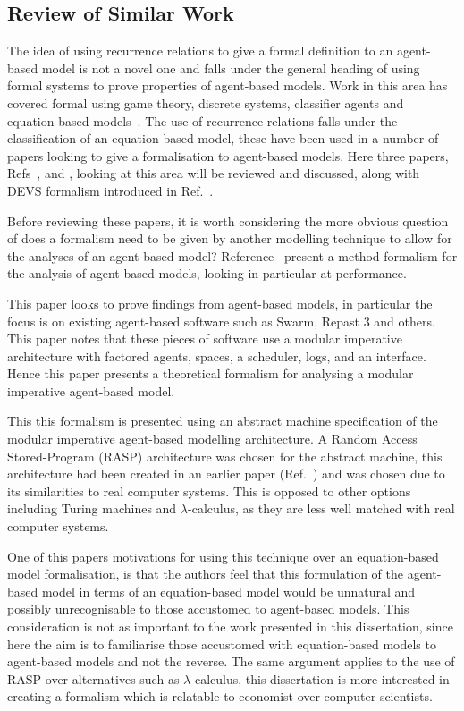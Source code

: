 \documentclass{article}
\begin{document}
\subsection{Review of Similar Work}\label{simwork}
The idea of using recurrence relations to give a formal definition to an agent-based model is not a novel one and falls under the general heading of using formal systems to prove properties of agent-based models. Work in this area has covered formal using game theory, discrete systems, classifier agents and equation-based models~\cite{taabm}. The use of recurrence relations falls under the classification of an equation-based model, these have been used in a number of papers looking to give a formalisation to agent-based models. Here three papers, Refs~\cite{ebmabmi}, \cite{econmistsnoabm} and \cite{abmtsd}, looking at this area will be reviewed and discussed, along with DEVS formalism introduced in Ref.~\cite{introdevs}.

Before reviewing these papers, it is worth considering the more obvious question of does a formalism need to be given by another modelling technique to allow for the analyses of an agent-based model? Reference~\cite{taabm} present a method formalism for the analysis of agent-based models, looking in particular at performance. 

This paper looks to prove findings from agent-based models, in particular the focus is on existing agent-based software such as Swarm, Repast 3 and others. This paper notes that these pieces of software use a modular imperative architecture with factored agents, spaces, a scheduler, logs, and an interface. Hence this paper presents a theoretical formalism for analysing a modular imperative agent-based model.    

This this formalism is presented using an abstract machine specification of the modular imperative agent-based modelling architecture. A  Random Access Stored-Program (RASP) architecture was chosen for the abstract machine, this architecture had been created in an earlier paper (Ref.~\cite{raspceated}) and was chosen due to its similarities to real computer systems. This is opposed to other options including Turing machines and $\lambda$-calculus, as they are less well matched with real computer systems.     

One of this papers motivations for using this technique over an equation-based model formalisation, is that the authors feel that this formulation of the agent-based model in terms of an equation-based model would be unnatural and possibly unrecognisable to those accustomed to agent-based models. This consideration is not as important to the work presented in this dissertation, since here the aim is to familiarise those accustomed with equation-based models to agent-based models and not the reverse. The same argument applies to the use of RASP over alternatives such as $\lambda$-calculus, this dissertation is more interested in creating a formalism which is relatable to economist over computer scientists.   
\end{document}
